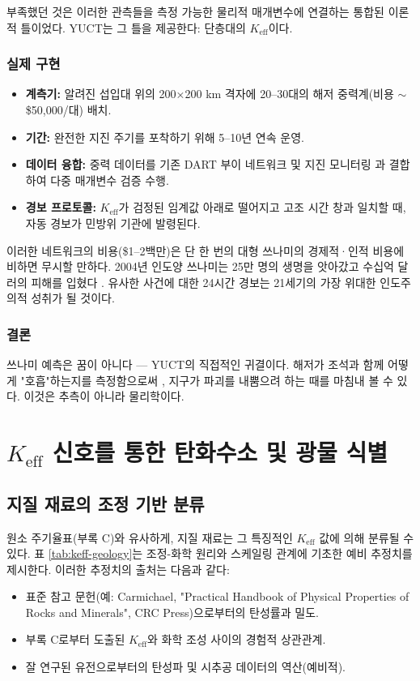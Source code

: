 \documentclass[12pt,a4paper]{article}
\theoremstyle{remark}
\newcommand{\Keff}{K_{\mathrm{eff}}}
\begin{document}
	부족했던 것은 이러한 관측들을 측정 가능한 물리적 매개변수에 연결하는 통합된 이론적 틀이었다. YUCT는 그 틀을 제공한다: 단층대의 \(K_{\mathrm{eff}}\)이다.
	
	\subsubsection{실제 구현}
	
	\begin{itemize}
		\item \textbf{계측기:} 알려진 섭입대 위의 200×200 km 격자에 20–30대의 해저 중력계(비용 \(\sim\) \$50,000/대) 배치.
		\item \textbf{기간:} 완전한 지진 주기를 포착하기 위해 5–10년 연속 운영.
		\item \textbf{데이터 융합:} 중력 데이터를 기존 DART 부이 네트워크 \cite{NOAA2024} 및 지진 모니터링 \cite{USGS2024}과 결합하여 다중 매개변수 검증 수행.
		\item \textbf{경보 프로토콜:} \(K_{\mathrm{eff}}\)가 검정된 임계값 아래로 떨어지고 고조 시간 창과 일치할 때, 자동 경보가 민방위 기관에 발령된다.
	\end{itemize}
	
	이러한 네트워크의 비용(\$1–2백만)은 단 한 번의 대형 쓰나미의 경제적·인적 비용에 비하면 무시할 만하다. 2004년 인도양 쓰나미는 25만 명의 생명을 앗아갔고 수십억 달러의 피해를 입혔다 \cite{NOAA2024, USGS2024}. 유사한 사건에 대한 24시간 경보는 21세기의 가장 위대한 인도주의적 성취가 될 것이다.
	
	\subsubsection{결론}
	
	쓰나미 예측은 꿈이 아니다 — YUCT의 직접적인 귀결이다. 해저가 조석과 함께 어떻게 "호흡"하는지를 측정함으로써 \cite{Tolstoy2013}, 지구가 파괴를 내뿜으려 하는 때를 마침내 볼 수 있다. 이것은 추측이 아니라 물리학이다.
	
	\section{\(\Keff\) 신호를 통한 탄화수소 및 광물 식별}
	\label{sec:identification}
	
	\subsection{지질 재료의 조정 기반 분류}
	
	원소 주기율표(부록 C)와 유사하게, 지질 재료는 그 특징적인 \(\Keff\) 값에 의해 분류될 수 있다. 표 \ref{tab:keff-geology}는 조정-화학 원리와 스케일링 관계에 기초한 예비 추정치를 제시한다. 이러한 추정치의 출처는 다음과 같다:
	\begin{itemize}
		\item 표준 참고 문헌(예: Carmichael, "Practical Handbook of Physical Properties of Rocks and Minerals", CRC Press)으로부터의 탄성률과 밀도.
		\item 부록 C로부터 도출된 \(\Keff\)와 화학 조성 사이의 경험적 상관관계.
		\item 잘 연구된 유전으로부터의 탄성파 및 시추공 데이터의 역산(예비적).
	\end{itemize}
	
\end{document}
